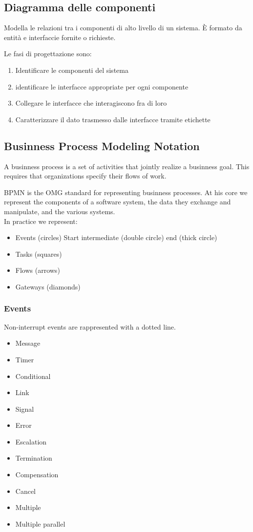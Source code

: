 \documentclass[12pt, a4paper]{article}
\begin{document}
\subsection{Diagramma delle componenti}
Modella le relazioni tra i componenti di alto livello di un sistema. È formato da entità e interfaccie fornite
o richieste.

Le fasi di progettazione sono: 
\begin{enumerate}
    \item Identificare le componenti del sistema
    \item identificare le interfacce appropriate per ogni componente
    \item Collegare le interfacce che interagiscono fra di loro
    \item Caratterizzare il dato trasmesso dalle interfacce tramite etichette
\end{enumerate}

\newpage
\subsection{Businness Process Modeling Notation}
A businness process is a set of activities that jointly realize a businness goal. This requires that organizations 
specify their flows of work.

BPMN is the OMG standard for representing businness processes. At his core we represent the components of a 
software system, the data they exchange and manipulate, and the various systems.\\ In practice we represent:
\begin{itemize}
    \item Events (circles)
    \subitem Start
    \subitem intermediate (double circle)
    \subitem end (thick circle)
    \item Tasks (squares)
    \item Flows (arrows)
    \item Gateways (diamonds)
\end{itemize}


\subsubsection{Events}
Non-interrupt events are rappresented with a dotted line.
\begin{itemize}
    \item Message 
    \item Timer 
    \item Conditional 
    \item Link 
    \item Signal 
    \item Error 
    \item Escalation 
    \item Termination 
    \item Compensation 
    \item Cancel 
    \item Multiple 
    \item Multiple parallel 
\end{itemize}
\end{document}
